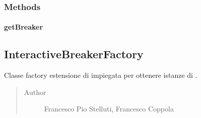 \documentclass[letterpaper,10pt,italian]{sphinxmanual}
\begin{document}
\subsubsection{Methods}
\label{\detokenize{source/it/unicam/cs/pa/mastermind/factories/BreakerFactory:methods}}

\paragraph{getBreaker}
\label{\detokenize{source/it/unicam/cs/pa/mastermind/factories/BreakerFactory:getbreaker}}

\begin{fulllineitems}
\label{\detokenize{source/it/unicam/cs/pa/mastermind/factories/BreakerFactory:it.unicam.cs.pa.mastermind.factories.BreakerFactory.getBreaker()}}
\end{fulllineitems}



\subsection{InteractiveBreakerFactory}
\label{\detokenize{source/it/unicam/cs/pa/mastermind/factories/InteractiveBreakerFactory:interactivebreakerfactory}}\label{\detokenize{source/it/unicam/cs/pa/mastermind/factories/InteractiveBreakerFactory::doc}}

\begin{fulllineitems}
\label{\detokenize{source/it/unicam/cs/pa/mastermind/factories/InteractiveBreakerFactory:it.unicam.cs.pa.mastermind.factories.InteractiveBreakerFactory}}
Classe factory estensione di  impiegata per ottenere istanze di .
\begin{quote}\begin{description}
\item[{Author}] \leavevmode
Francesco Pio Stelluti, Francesco Coppola

\end{description}\end{quote}

\end{fulllineitems}
\end{document}
